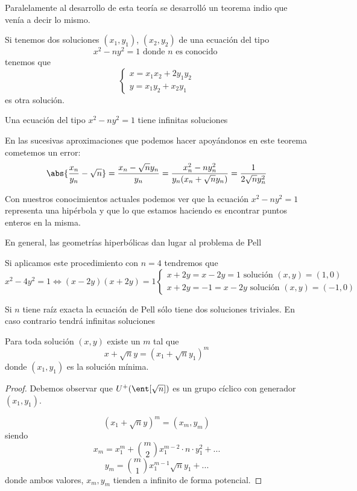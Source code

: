 \documentclass{apuntes}
\begin{document}
Paralelamente al desarrollo de esta teoría se desarrolló un teorema indio que venía a decir lo mismo.

\begin{theorem}
Si tenemos dos soluciones $(x_1,y_1)$, $(x_2,y_2)$ de una ecuación del tipo
\[x^2-ny^2=1 \text{ donde } n \text{ es conocido }\]
tenemos que
\[\left\{ \begin{array}{l} x= x_1x_2+2y_1y_2 \\ y=x_1y_2+x_2y_1 \end{array}\right.\]
es otra solución.
\end{theorem}
\begin{corol}
Una ecuación del tipo $x^2-ny^2=1$ tiene infinitas soluciones
\end{corol}

\obs En las sucesivas aproximaciones que podemos hacer apoyándonos en este teorema cometemos un error:
\[\abs{\frac{x_n}{y_n} - \sqrt{n}} = \frac{x_n-\sqrt{n}y_n}{y_n} = \frac{x_n^2-ny_n^2}{y_n(x_n + \sqrt{n}y_n)}=\frac{1}{2\sqrt{n}y_n^2}\]

Con nuestros conocimientos actuales podemos ver que la ecuación $x^2-ny^2 =1$ representa una hipérbola y que lo que estamos haciendo es encontrar puntos enteros en la misma.

En general, las geometrías hiperbólicas dan lugar al problema de Pell

\obs Si aplicamos este procedimiento con $n=4$ tendremos que
\[x^2-4y^2 = 1 \iff (x-2y)(x+2y) = 1 \left\{ \begin{array}{l} x+2y=x-2y = 1 \text{ solución } (x,y)=(1,0) \\ x+2y=-1=x-2y \text{ solución } (x,y)=(-1,0)\end{array}\right.\]

\begin{theorem}
Si $n$ tiene raíz exacta la ecuación de Pell sólo tiene dos soluciones triviales. En caso contrario tendrá infinitas soluciones
\end{theorem}

\begin{theorem}
Para toda solución $(x,y)$ existe un $m$ tal que
\[x+\sqrt{n}y = \left( x_1+\sqrt{n}y_1\right)^m\]
donde $(x_1,y_1)$ es la solución mínima.
\end{theorem}
\begin{proof}
Debemos observar que $U^+(\ent[\sqrt{n}])$ es un grupo cíclico con generador $(x_1,y_1)$.

\[(x_1+\sqrt{n}y)^m = (x_m,y_m)\]
siendo
\[x_m = x_1^m+ {m \choose 2 } x_1^{m-2}\cdot n \cdot y_1^2 + ...\]
\[y_m = {m \choose 1}x_1^{m-1}\sqrt{n}y_1 + ...\]
donde ambos valores, $x_m,y_m$ tienden a infinito de forma potencial.
\end{proof}
\end{document}
